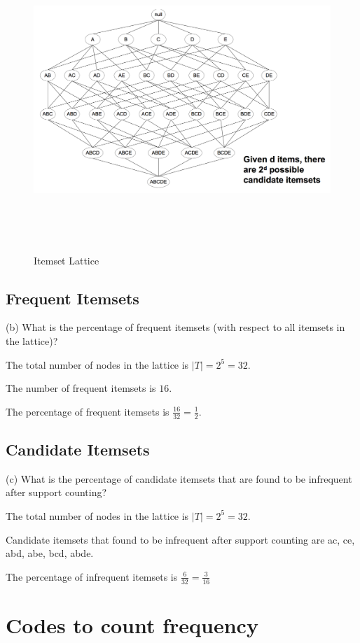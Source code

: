 \documentclass[11pt,a4paper]{article}
\begin{document}
\begin{figure}[h]
    \centering
    \includegraphics[width=6.5in,height=4.5in]{./lattice.png}
    \caption{Itemset Lattice}
\end{figure}

\subsection{Frequent Itemsets}
(b) What is the percentage of frequent itemsets (with respect to all itemsets
in the lattice)?

The total number of nodes in the lattice is $|T| = 2^{5} = 32$.

The number of frequent itemsets is $16$.

The percentage of frequent itemsets is $\frac{16}{32} = \frac{1}{2}$.

\subsection{Candidate Itemsets}
(c) What is the percentage of candidate itemsets that are found to be
infrequent after support counting?

The total number of nodes in the lattice is $|T| = 2^{5} = 32$.


Candidate itemsets that found to be infrequent after support counting are ac,
ce, abd, abe, bcd, abde. 

The percentage of infrequent itemsets is $\frac{6}{32} = \frac{3}{16}$

\newpage
\appendix
\section{Codes to count frequency}
\end{document}
